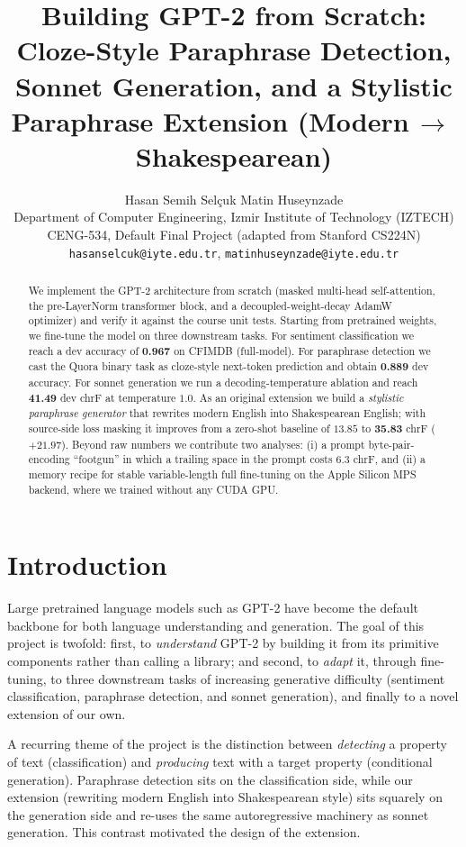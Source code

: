 \documentclass[10pt,twocolumn]{article}
\title{\vspace{-2.0em}\textbf{Building GPT-2 from Scratch: Cloze-Style Paraphrase
Detection, Sonnet Generation, and a Stylistic Paraphrase Extension
(Modern\,$\rightarrow$\,Shakespearean)}}
\author{
  Hasan Semih Sel\c{c}uk \quad\quad Matin Huseynzade \\
  \small Department of Computer Engineering, Izmir Institute of Technology (IZTECH) \\
  \small CENG-534, Default Final Project (adapted from Stanford CS224N) \\
  \small \texttt{hasanselcuk@iyte.edu.tr}, \texttt{matinhuseynzade@iyte.edu.tr}
}
\date{}
\newcommand{\best}[1]{\textbf{#1}}
\begin{document}
\maketitle

\begin{abstract}
\noindent
We implement the GPT-2 architecture from scratch (masked multi-head
self-attention, the pre-LayerNorm transformer block, and a decoupled-weight-decay
AdamW optimizer) and verify it against the course unit tests. Starting from
pretrained weights, we fine-tune the model on three downstream tasks. For
sentiment classification we reach a dev accuracy of \best{0.967} on CFIMDB
(full-model). For paraphrase detection we cast the Quora binary task as
cloze-style next-token prediction and obtain \best{0.889} dev accuracy. For
sonnet generation we run a decoding-temperature ablation and reach \best{41.49}
dev chrF at temperature $1.0$. As an original extension we build a
\emph{stylistic paraphrase generator} that rewrites modern English into
Shakespearean English; with source-side loss masking it improves from a
zero-shot baseline of $13.85$ to \best{35.83} chrF ($+21.97$). Beyond raw
numbers we contribute two analyses: (i) a prompt byte-pair-encoding ``footgun''
in which a trailing space in the prompt costs $6.3$ chrF, and (ii) a memory
recipe for stable variable-length full fine-tuning on the Apple Silicon MPS
backend, where we trained without any CUDA GPU.
\end{abstract}

\section{Introduction}
Large pretrained language models such as GPT-2 \cite{radford2019language} have
become the default backbone for both language understanding and generation. The
goal of this project is twofold: first, to \emph{understand} GPT-2 by building it
from its primitive components rather than calling a library; and second, to
\emph{adapt} it, through fine-tuning, to three downstream tasks of increasing
generative difficulty (sentiment classification, paraphrase detection, and
sonnet generation), and finally to a novel extension of our own.

A recurring theme of the project is the distinction between \emph{detecting} a
property of text (classification) and \emph{producing} text with a target
property (conditional generation). Paraphrase detection sits on the
classification side, while our extension (rewriting modern English into Shakespearean
style) sits squarely on the generation side and re-uses the same autoregressive
machinery as sonnet generation. This contrast motivated the design of the
extension.
\end{document}
